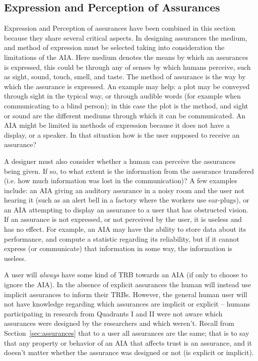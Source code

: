 \subsection{Expression and Perception of Assurances} \label{sec:express_assurances}
    Expression and Perception of assurances have been combined in this section because they share several critical aspects. In designing assurances the medium, and method of expression must be selected taking into consideration the limitations of the AIA. Here medium denotes the means by which an assurances is expressed, this could be through any of senses by which humans perceive, such as sight, sound, touch, smell, and taste. The method of assurance is the way by which the assurance is expressed. An example may help: a plot may be conveyed through sight in the typical way, or through audible words (for example when communicating to a blind person); in this case the plot is the method, and sight or sound are the different mediums through which it can be communicated. An AIA might be limited in methods of expression because it does not have a display, or a speaker. In that situation how is the user supposed to receive an assurance?

    A designer must also consider whether a human can perceive the assurances being given. If so, to what extent is the information from the assurance transfered (i.e. how much information was lost in the communication)? A few examples include: an AIA giving an auditory assurance in a noisy room and the user not hearing it (such as an alert bell in a factory where the workers use ear-plugs), or an AIA attempting to display an assurance to a user that has obstructed vision. If an assurance is not expressed, or not perceived by the user, it is useless and has no effect. For example, an AIA may have the ability to store data about its performance, and compute a statistic regarding its reliability, but if it cannot express (or communicate) that information in some way, the information is useless.

    A user will \emph{always} have some kind of TRB towards an AIA (if only to choose to ignore the AIA). In the absence of explicit assurances the human will instead use implicit assurances to inform their TRBs. However, the general human user will not have knowledge regarding which assurances are implicit or explicit -- humans participating in research from Quadrants I and II were not aware which assurances were designed by the researchers and which weren't. Recall from Section~\ref{sec:assurances} that to a user all assurances are the same; that is to say that any property or behavior of an AIA that affects trust is an assurance, and it doesn't matter whether the assurance was designed or not (is explicit or implicit).

